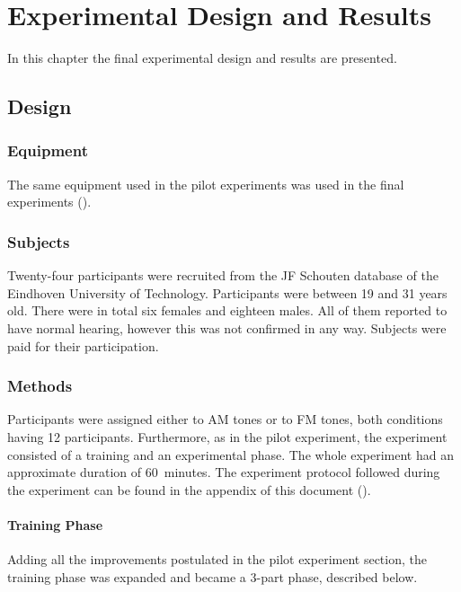 \documentclass[../main.tex]{subfiles}
\begin{document}
\chapter{Experimental Design and Results}
\label{cha:experiment}

In this chapter the final experimental design and results are presented.

\section{Design}

\subsection{Equipment}

The same equipment used in the pilot experiments was used in the final
experiments ().

\subsection{Subjects}

Twenty-four participants were recruited from the JF Schouten database of the
Eindhoven University of Technology. Participants were between 19 and 31 years
old. There were in total six females and eighteen males. All of them reported
to have normal hearing, however this was not confirmed in any way. Subjects were
paid for  their participation.

\subsection{Methods}

Participants were assigned either to \gls{AM} tones or to \gls{FM} tones, both
conditions having 12 participants. Furthermore, as in the pilot experiment, the
experiment consisted of a training and an experimental phase. The whole
experiment had an approximate duration of 60~minutes. The experiment protocol
followed during the experiment can be found in the appendix of this document
().

\subsubsection{Training Phase}

Adding all the improvements postulated in the pilot experiment section, the
training phase was expanded and became a 3-part phase, described below.
\end{document}
